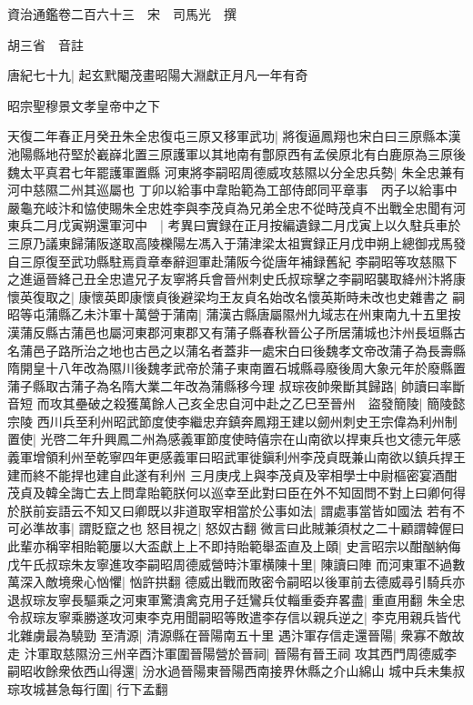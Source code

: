 資治通鑑卷二百六十三　宋　司馬光　撰

胡三省　音註

唐紀七十九|{
	起玄黓閹茂畫昭陽大淵獻正月凡一年有奇}


昭宗聖穆景文孝皇帝中之下

天復二年春正月癸丑朱全忠復屯三原又移軍武功|{
	將復逼鳳翔也宋白曰三原縣本漢池陽縣地苻堅於嶻嶭北置三原護軍以其地南有鄷原西有孟侯原北有白鹿原為三原後魏太平真君七年罷護軍置縣}
河東將李嗣昭周德威攻慈隰以分全忠兵勢|{
	朱全忠兼有河中慈隰二州其巡屬也}
丁卯以給事中韋貽範為工部侍郎同平章事　丙子以給事中嚴龜充岐汴和恊使賜朱全忠姓李與李茂貞為兄弟全忠不從時茂貞不出戰全忠聞有河東兵二月戊寅朔還軍河中　|{
	考異曰實録在正月按編遺録二月戊寅上以久駐兵車於三原乃議東歸蒲阪遂取高陵櫟陽左馮入于蒲津梁太祖實録正月戊申朔上總御戎馬發自三原復至武功縣駐焉貢章奉辭迴軍赴蒲阪今從唐年補録舊紀}
李嗣昭等攻慈隰下之進逼晉絳己丑全忠遣兄子友寧將兵會晉州刺史氏叔琮擊之李嗣昭襲取絳州汴將康懷英復取之|{
	康懷英即康懷貞後避梁均王友貞名始改名懷英斯時未改也史雜書之}
嗣昭等屯蒲縣乙未汴軍十萬營于蒲南|{
	蒲漢古縣唐屬隰州九域志在州東南九十五里按漢蒲反縣古蒲邑也屬河東郡河東郡又有蒲子縣春秋晉公子所居蒲城也汴州長垣縣古名蒲邑子路所治之地也古邑之以蒲名者蓋非一處宋白曰後魏孝文帝改蒲子為長壽縣隋開皇十八年改為隰川後魏孝武帝於蒲子東南置石城縣尋廢後周大象元年於廢縣置蒲子縣取古蒲子為名隋大業二年改為蒲縣移今理}
叔琮夜帥衆斷其歸路|{
	帥讀曰率斷音短}
而攻其壘破之殺獲萬餘人己亥全忠自河中赴之乙巳至晉州　盜發簡陵|{
	簡陵懿宗陵}
西川兵至利州昭武節度使李繼忠弃鎮奔鳳翔王建以劒州刺史王宗偉為利州制置使|{
	光啓二年升興鳳二州為感義軍節度使時僖宗在山南欲以捍東兵也文德元年感義軍增領利州至乾寧四年更感義軍曰昭武軍徙鎭利州李茂貞既兼山南欲以鎮兵捍王建而終不能捍也建自此遂有利州}
三月庚戌上與李茂貞及宰相學士中尉樞密宴酒酣茂貞及韓全誨亡去上問韋貽範朕何以巡幸至此對曰臣在外不知固問不對上曰卿何得於朕前妄語云不知又曰卿既以非道取宰相當於公事如法|{
	謂處事當皆如國法}
若有不可必準故事|{
	謂貶竄之也}
怒目視之|{
	怒奴古翻}
微言曰此賊兼須杖之二十顧謂韓偓曰此輩亦稱宰相貽範屢以大盃獻上上不即持貽範舉盃直及上頤|{
	史言昭宗以酣酗納侮}
戊午氏叔琮朱友寧進攻李嗣昭周德威營時汴軍横陳十里|{
	陳讀曰陣}
而河東軍不過數萬深入敵境衆心忷懼|{
	忷許拱翻}
德威出戰而敗密令嗣昭以後軍前去德威尋引騎兵亦退叔琮友寧長驅乘之河東軍驚潰禽克用子廷鸞兵仗輜重委弃畧盡|{
	重直用翻}
朱全忠令叔琮友寧乘勝遂攻河東李克用聞嗣昭等敗遣李存信以親兵逆之|{
	李克用親兵皆代北雜虜最為驍勁}
至清源|{
	清源縣在晉陽南五十里}
遇汴軍存信走還晉陽|{
	衆寡不敵故走}
汴軍取慈隰汾三州辛酉汴軍圍晉陽營於晉祠|{
	晉陽有晉王祠}
攻其西門周德威李嗣昭收餘衆依西山得還|{
	汾水過晉陽東晉陽西南接界休縣之介山綿山}
城中兵未集叔琮攻城甚急每行圍|{
	行下孟翻}
